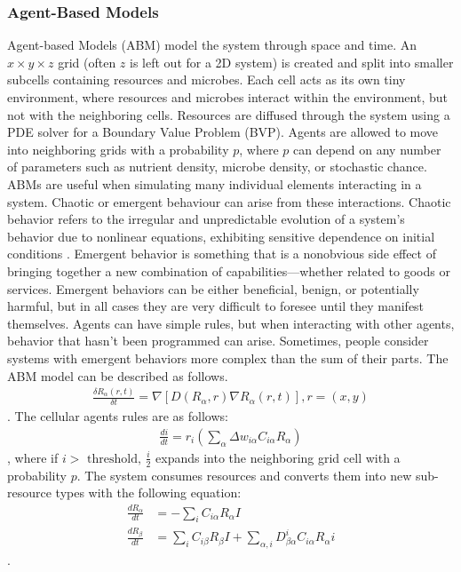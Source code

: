 \subsubsection{Agent-Based Models}
Agent-based Models (ABM) model the system through space and time. An $x \times y \times z$ grid (often $z$ is left out for a 2D system) is created and split into smaller subcells containing resources and microbes. Each cell acts as its own tiny environment, where resources and microbes interact within the environment, but not with the neighboring cells. Resources are diffused through the system using a PDE solver for a Boundary Value Problem (BVP). Agents are allowed to move into neighboring grids with a probability $p$, where $p$ can depend on any number of parameters such as nutrient density, microbe density, or stochastic chance. \newline 
ABMs are useful when simulating many individual elements interacting in a system. Chaotic or emergent behaviour can arise from these interactions. Chaotic behavior refers to the irregular and unpredictable evolution of a system's behavior due to nonlinear equations, exhibiting sensitive dependence on initial conditions \cite{encyclopedia_of_physical_science_and_technology}. \newline 
Emergent behavior is something that is a nonobvious side effect of bringing together a new combination of capabilities—whether related to goods or services. Emergent behaviors can be either beneficial, benign, or potentially harmful, but in all cases they are very difficult to foresee until they manifest themselves. Agents can have simple rules, but when interacting with other agents, behavior that hasn't been programmed can arise. Sometimes, people consider systems with emergent behaviors more complex than the sum of their parts.
The ABM model can be described as follows.
\begin{align} 
    \frac{\delta R_\alpha(r, t)}{\delta t} = \nabla \left[D \left( R_\alpha, r\right) \nabla R_\alpha \left( r, t \right) \right], r = \left(x, y\right)
\end{align}. 
The cellular agents rules are as follows: 
\begin{align} 
    \frac{di}{dt} = r_i \left( \sum_\alpha \Delta w_{i\alpha}C_{i\alpha}R_\alpha\right)
\end{align}, where if $i> \text{ threshold, }\frac{i}{2}$ expands into the neighboring grid cell with a probability $p$. 
The system consumes resources and converts them into new sub-resource types with the following equation:
\begin{align}    
    \frac{dR_\alpha}{dt} &= -\sum_i C_{i\alpha}R_\alpha I \\
    \frac{dR_\beta}{dt} &= \sum_i C_{i\beta}R_\beta I + \sum_{\alpha, i}D_{\beta \alpha}^{i} C_{i \alpha} R_\alpha i
\end{align}. 






